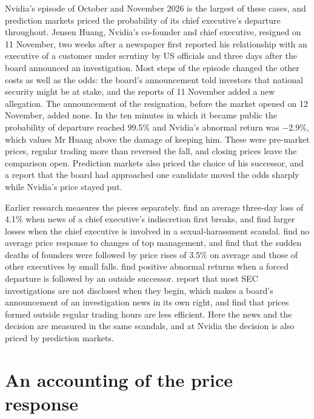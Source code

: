 \documentclass[11pt,a4paper]{article}
\begin{document}
Nvidia's episode of October and November 2026 is the largest of these cases, and prediction markets priced the probability of its chief executive's departure throughout. Jensen Huang, Nvidia's co-founder and chief executive, resigned on 11 November, two weeks after a newspaper first reported his relationship with an executive of a customer under scrutiny by US officials and three days after the board announced an investigation. Most steps of the episode changed the other costs as well as the odds: the board's announcement told investors that national security might be at stake, and the reports of 11 November added a new allegation. The announcement of the resignation, before the market opened on 12 November, added none. In the ten minutes in which it became public the probability of departure reached 99.5\% and Nvidia's abnormal return was $-2.9$\%, which values Mr Huang above the damage of keeping him. These were pre-market prices, regular trading more than reversed the fall, and closing prices leave the comparison open. Prediction markets also priced the choice of his successor, and a report that the board had approached one candidate moved the odds sharply while Nvidia's price stayed put.

Earlier research measures the pieces separately. \citet{cline2018} find an average three-day loss of 4.1\% when news of a chief executive's indiscretion first breaks, and \citet{borelli2021} find larger losses when the chief executive is involved in a sexual-harassment scandal. \citet{warner1988} find no average price response to changes of top management, and \citet{johnson1985} find that the sudden deaths of founders were followed by price rises of 3.5\% on average and those of other executives by small falls. \citet{huson2004} find positive abnormal returns when a forced departure is followed by an outside successor. \citet{blackburne2021} report that most SEC investigations are not disclosed when they begin, which makes a board's announcement of an investigation news in its own right, and \citet{barclay2003} find that prices formed outside regular trading hours are less efficient. Here the news and the decision are measured in the same scandals, and at Nvidia the decision is also priced by prediction markets.

\section{An accounting of the price response}\label{sec:frame}
\end{document}
